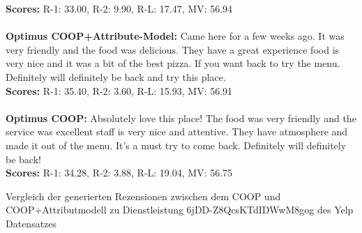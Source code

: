 \begin{Rezension}[!h]
{{        \textbf{Scores:} R-1: 33.00, R-2: 9.90, R-L: 17.47, MV: 56.94 \\ \\

        \textbf{Optimus COOP+Attribute-Model:} Came here for \textcolor{HighlightColor}{a} few weeks ago\textcolor{HighlightColor}{.} It was very friendly \textcolor{HighlightColor}{and} \textcolor{HighlightColor}{the} \textcolor{HighlightColor}{food} was delicious\textcolor{HighlightColor}{.} They \textcolor{HighlightColor}{have} \textcolor{HighlightColor}{a} great experience\ccolorbox[BackgroundColor]{\textcolor{HighlightColor}{. The}} \textcolor{HighlightColor}{food} \textcolor{HighlightColor}{is} very \textcolor{HighlightColor}{nice} \textcolor{HighlightColor}{and} it was \textcolor{HighlightColor}{a} bit \textcolor{HighlightColor}{of} \textcolor{HighlightColor}{the} best pizza\textcolor{HighlightColor}{.} If you want \ccolorbox[BackgroundColor]{ \textcolor{HighlightColor}{to go}} back \textcolor{HighlightColor}{to} try \textcolor{HighlightColor}{the} menu\textcolor{HighlightColor}{.} Definitely will definitely \textcolor{HighlightColor}{be} back \textcolor{HighlightColor}{and} try this \textcolor{HighlightColor}{place}\textcolor{HighlightColor}{.}         \\ 
        \textbf{Scores:} R-1: 35.40, R-2: 3.60, R-L: 15.93, MV: 56.91 \\ \\
        \textbf{Optimus COOP:} Absolutely love this \textcolor{HighlightColor}{place}! \textcolor{HighlightColor}{The} \textcolor{HighlightColor}{food} was very friendly \textcolor{HighlightColor}{and} \textcolor{HighlightColor}{the} service was excellent\ccolorbox[BackgroundColor]{\textcolor{HighlightColor}{. The}} staff \textcolor{HighlightColor}{is} very \textcolor{HighlightColor}{nice} \textcolor{HighlightColor}{and} attentive\textcolor{HighlightColor}{.} They \textcolor{HighlightColor}{have} \ccolorbox[BackgroundColor]{ \textcolor{HighlightColor}{a nice}} \textcolor{HighlightColor}{atmosphere} \textcolor{HighlightColor}{and} made it out \textcolor{HighlightColor}{of} \textcolor{HighlightColor}{the} menu\textcolor{HighlightColor}{.} It's \textcolor{HighlightColor}{a} must try \textcolor{HighlightColor}{to} come back\textcolor{HighlightColor}{.} Definitely will definitely \textcolor{HighlightColor}{be} back!         \\ 
        \textbf{Scores:} R-1: 34.28, R-2: 3.88, R-L: 19.04, MV: 56.75  
        }
    }
    \caption{Vergleich der generierten Rezensionen zwischen dem COOP und COOP+Attributmodell zu Dienstleistung 6jDD-Z8QcsKTdIDWwM8gog des Yelp Datensatzes}
    \label{reviewYelp2}
\end{Rezension}


